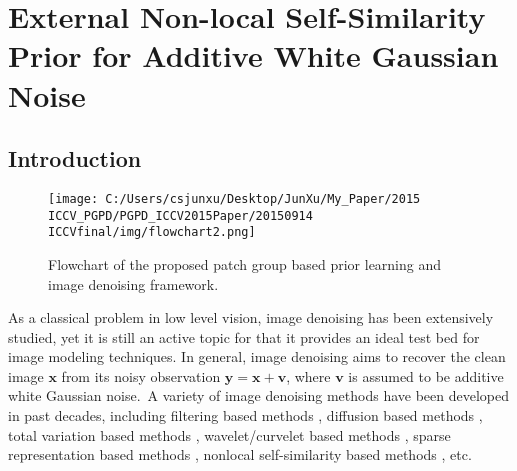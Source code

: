 %
\chapter{External Non-local Self-Similarity Prior for Additive White Gaussian Noise}
\label{sec:external}




\section{Introduction}
\vspace{-0.04in}
\begin{figure*}
\centering
\texttt{[image: C:/Users/csjunxu/Desktop/JunXu/My\_Paper/2015 ICCV\_PGPD/PGPD\_ICCV2015Paper/20150914 ICCVfinal/img/flowchart2.png]}
\vspace{-0.11in}
\caption{Flowchart of the proposed patch group based prior learning and image denoising framework.}
\vspace{-0.22in}
\label{fig1}
\end{figure*}
As a classical problem in low level vision, image denoising has been extensively studied, yet it is still an active topic for that it provides an ideal test bed for image modeling techniques. In general, image denoising aims to recover the clean image $\mathbf{x}$ from its noisy observation $\mathbf{y} = \mathbf{x} + \mathbf{v}$, where $\mathbf{v}$ is assumed to be additive white Gaussian noise.\ A variety of image denoising methods have been developed in past decades, including filtering based methods \cite{Tomasi1998}, diffusion based methods \cite{PeronaMalik1990}, total variation based methods \cite{rudin1992nonlinear,osher2005iterative}, wavelet/curvelet based methods \cite{softthresholding,bayesshrink,curvelet}, sparse representation based methods \cite{ksvd,lssc,ncsr}, nonlocal self-similarity based methods \cite{nlm,bm3d,nnm,wnnm}, etc.

